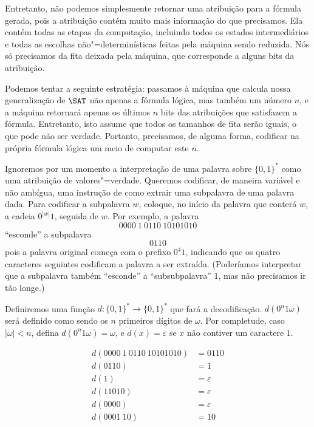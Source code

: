 Entretanto,
não podemos simplesmente retornar uma atribuição para a fórmula gerada,
pois a atribuição contém muito mais informação do que precisamos.
Ela contém todas as etapas da computação,
incluindo todos os estados intermediários
e todas as escolhas não"=determinísticas feitas pela máquina sendo reduzida.
Nós só precisamos da fita deixada pela máquina,
que corresponde a alguns bits da atribuição.

Podemos tentar a seguinte estratégia:
passamos à máquina que calcula nossa generalização de $\SAT$
não apenas a fórmula lógica,
mas também um número $n$,
e a máquina retornará apenas os últimos $n$
bits das atribuições que satisfazem a fórmula.
Entretanto, isto assume que todos os tamanhos de fita serão iguais,
o que pode não ser verdade.
Portanto, precisamos, de alguma forma, codificar na própria fórmula lógica
um meio de computar este $n$.

Ignoremos por um momento a interpretação de uma palavra sobre $\{0, 1\}^*$
como uma atribuição de valores"=verdade.
Queremos codificar, de maneira variável e não ambígua,
uma instrução de como extrair uma subpalavra de uma palavra dada.
Para codificar a subpalavra $w$,
coloque, no início da palavra que conterá $w$,
a cadeia $0^{|w|}1$, seguida de $w$.
Por exemplo,
a palavra
\begin{equation*}
    0000\ 1\ 0110\ 10101010
\end{equation*}
``esconde'' a subpalavra
\begin{equation*}
    0110
\end{equation*}
pois a palavra original começa com o prefixo $0^4 1$,
indicando que os quatro caracteres seguintes codificam a palavra a ser extraída.
(Poderíamos interpretar que a subpalavra também ``esconde''
a ``subsubpalavra'' $1$, mas não precisamos ir tão longe.)

Definiremos uma função $d: \{0, 1\}^* \to \{0, 1\}^*$ que fará a decodificação.
$d(0^n1\omega)$ será definido como sendo os $n$ primeiros dígitos de $\omega$.
Por completude, caso $|\omega| < n$, defina $d(0^n1\omega) = \omega$,
e $d(x) = \varepsilon$ se $x$ não contiver um caractere $1$.
\begin{example}
    \begin{align*}
        d(0000\ 1\ 0110\ 10101010) &= 0110 \\
        d(0110) &= 1 \\
        d(1) &= \varepsilon \\
        d(11010) &= \varepsilon \\
        d(0000) &= \varepsilon \\
        d(0001\ 10) &= 10
    \end{align*}
\end{example}

